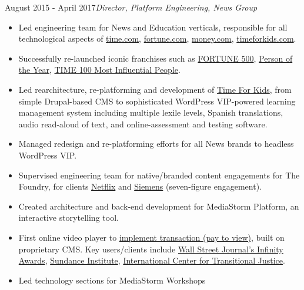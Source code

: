 \documentclass[a4paper,10pt]{memoir} %
\begin{document}

 {August 2015 - April 2017}{\textit{Director, Platform Engineering, News Group}}
\begin{itemize}
	\item Led engineering team for News and Education verticals, responsible for all technological aspects of \href{http://time.com}{time.com}, \href{http://fortune.com}{fortune.com},  \href{http://money.com}{money.com}, \href{https://www.timeforkids.com}{timeforkids.com}. 
	\item Successfully re-launched iconic franchises such as \href{http://fortune.com/fortune500}{FORTUNE 500}, \href{http://time.com/time-person-of-the-year-2017-silence-breakers/}{Person of the Year}, \href{http://time.com/collection/most-influential-people-2018/}{TIME 100 Most Influential People}.
	\item Led rearchitecture, re-platforming and development of \href{https://www.timeforkids}{Time For Kids}, from simple Drupal-based CMS to sophisticated WordPress VIP-powered learning management system including multiple lexile levels, Spanish translations, audio read-aloud of text, and online-assessment and testing software. 
	\item Managed redesign and re-platforming efforts for all News brands to headless WordPress VIP.
	\item Supervised engineering team for native/branded content engagements for The Foundry, for clients \href{http://time.com/paid-content-from/netflix/dinnertime/}{Netflix} and \href{http://time.com/partner/siemens/innovation-starts-here/}{Siemens} (seven-figure engagement).
\end{itemize}
\Sep %

\begin{itemize}
	\item Created architecture and back-end development for MediaStorm Platform, an interactive storytelling tool. 
	\item First online video player to \href{http://time.com/46716/game-changer-mediastorm-launches-pay-per-story-video-player/}{implement transaction (pay to view)}, built on proprietary CMS. Key users/clients include \href{https://mediastorm.com/clients/2018-icp-infinity-awards}{Wall Street Journal's Infinity Awards}, \href{https://mediastorm.com/clients/sundance-short-film-challenge}{Sundance Institute}, \href{https://mediastorm.com/clients/i-am-not-who-they-think-i-am-for-ictj}{International Center for Transitional Justice}. 
	\item Led technology sections for MediaStorm Workshops
\end{itemize}
\Sep %
\end{document}
